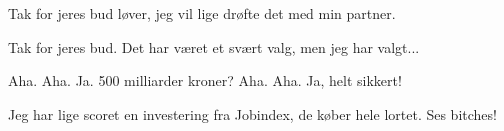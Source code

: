 \documentclass[a4paper,11pt]{article}
\begin{document}
\begin{sketch}
 Tak for jeres bud løver, jeg vil lige drøfte det med min partner.



 Tak for jeres bud. Det har været et svært valg, men jeg har valgt...


 Aha. Aha. Ja. 500 milliarder kroner? Aha. Aha. Ja, helt sikkert!

 Jeg har lige scoret en investering fra Jobindex, de køber hele lortet. Ses bitches!



\end{sketch}
\end{document}
